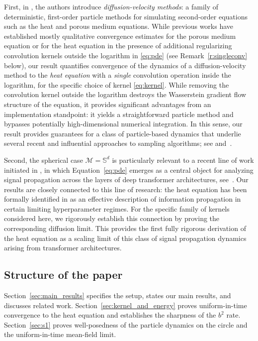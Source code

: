 \documentclass[11pt]{article}
\theoremstyle{definition}
\begin{document}
First, in \cite{degond1990deterministic,lacombe1999analyse}, the authors introduce \emph{diffusion-velocity methods}: a family of deterministic, first-order particle methods for simulating second-order equations such as the heat and porous medium equations. While previous works have established mostly qualitative convergence estimates for the porous medium equation \cite{oelschlager1985law, oelschlager2001sequence,lions2001methode,figalli2008convergence,carrillo2016gradient,carrillo2019blob, peletier2025nonlinear} or for the heat equation in the presence of additional regularizing convolution kernels outside the logarithm in \eqref{eq:pde} \cite{craig2025nonlocal,carrillo2024nonlocallinear} (see Remark~\ref{r:singleconv} below), our result quantifies convergence of the dynamics of a diffusion-velocity method to the \emph{heat equation} with a \emph{single} convolution operation inside the logarithm, for the specific choice of kernel \eqref{eq:kernel}. While removing the convolution kernel outside the logarithm destroys the Wasserstein gradient flow structure of the equation, it provides significant advantages from an implementation standpoint: it yields a straightforward particle method and bypasses potentially high-dimensional numerical integration. In this sense, our result provides guarantees for a class of particle-based dynamics that underlie several recent and influential approaches to sampling algorithms; see \cite[Chapter~6]{CheNilRig25} and~\cite{Che26}.


Second, the spherical case $\mathcal M=\mathbb S^d$ is particularly relevant to a recent line of work initiated in \cite{geshkovski2024emergence,geshkovski2025mathematical}, in which Equation~\eqref{eq:pde} emerges as a central object for analyzing signal propagation across the layers of deep transformer architectures, see~\cite{Rig26}. Our results are closely connected to this line of research: the heat equation has been formally identified in \cite{sander2022sinkformers,multiscale2025transformers} as an effective description of information propagation in certain limiting hyperparameter regimes. For the specific family of kernels considered here, we rigorously establish this connection by proving the corresponding diffusion limit. This provides the first fully rigorous derivation of the heat equation as a scaling limit of this class of signal propagation dynamics arising from transformer architectures.






\subsection{Structure of the paper} 
Section~\ref{sec:main_results} specifies the setup, states our main results, and discusses related work. Section~\ref{sec:kernel_and_energy} proves uniform-in-time convergence to the heat equation and establishes the sharpness of the $b^2$ rate. Section~\ref{sec:s1} proves well-posedness of the particle dynamics on the circle and the uniform-in-time mean-field limit. 
\end{document}
